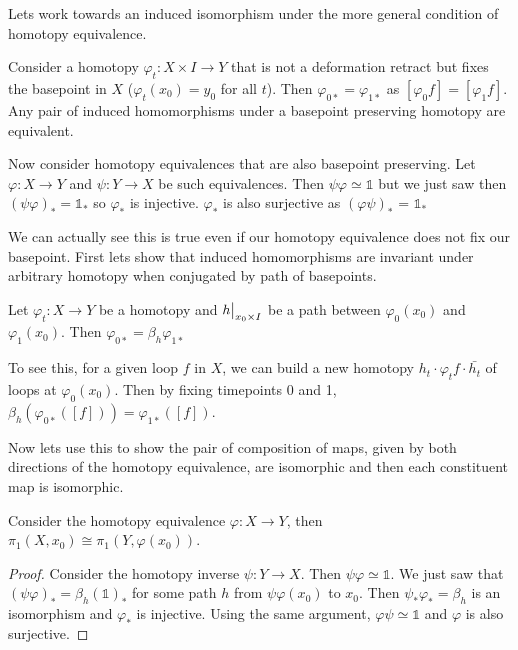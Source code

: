\documentclass[10pt]{article}
\newcommand\restr[2]{{%
  \left.\kern-\nulldelimiterspace %
  #1 %
  \vphantom{\big|} %
  \right|_{#2} %
}}
\begin{document}
Lets work towards an induced isomorphism under the more general condition of
homotopy equivalence.

Consider a homotopy $\varphi_t: X \times I \to Y$ that is not a deformation
retract but fixes the basepoint in $X$ ($\varphi_t(x_0) = y_0$ for all $t$).
Then $\varphi_{0*} = \varphi_{1*}$ as $[\varphi_0f] = [\varphi_1f]$. Any pair
of induced homomorphisms under a basepoint preserving homotopy are equivalent.

Now consider homotopy equivalences that are also basepoint preserving. Let
$\varphi: X \to Y$ and $\psi: Y \to X$ be such equivalences. Then $\psi\varphi
\simeq \mathds{1}$ but we just saw then $(\psi\varphi)_* = \mathds{1}_*$ so
$\varphi_*$ is injective. $\varphi_*$ is also surjective as $(\varphi\psi)_*$ =
$\mathds{1}_*$

We can actually see this is true even if our homotopy equivalence does not fix
our basepoint. First lets show that induced homomorphisms are invariant under
arbitrary homotopy when conjugated by path of basepoints.

\begin{lemma}[]
	Let $\varphi_t: X \to Y$ be a homotopy and $\restr{h}{x_0 \times I}$ be a path between $\varphi_0(x_0)$ and $\varphi_1(x_0)$. Then $\varphi_{0*} = \beta_h \varphi_{1*}$
\end{lemma}

\begin{note}
	To see this, for a given loop $f$ in $X$, we can build a new homotopy $h_t
	\cdot \varphi_tf \cdot \bar{h_t}$ of loops at $\varphi_0(x_0)$. Then by
	fixing timepoints 0 and 1, $\beta_h(\varphi_{0*}([f])) = \varphi_{1*}([f])$.
\end{note}

Now lets use this to show the pair of composition of maps, given by both
directions of the homotopy equivalence, are isomorphic and then each
constituent map is isomorphic.

\begin{theorem}
Consider the homotopy equivalence $\varphi: X \to Y$, then $\pi_1(X, x_0) \cong \pi_1(Y, \varphi(x_0))$.
\end{theorem}

\begin{proof}
	Consider the homotopy inverse $\psi: Y \to X$. Then $\psi\varphi \simeq \mathds{1}$. We just saw that $(\psi\varphi)_* = \beta_h(\mathds{1})_*$ for some path $h$ from $\psi\varphi(x_0)$ to $x_0$. Then $\psi_*\varphi_* = \beta_h$ is an isomorphism and $\varphi_*$ is injective.
	Using the same argument, $\varphi\psi \simeq \mathds{1}$ and $\varphi$ is also surjective.
\end{proof}
\end{document}
